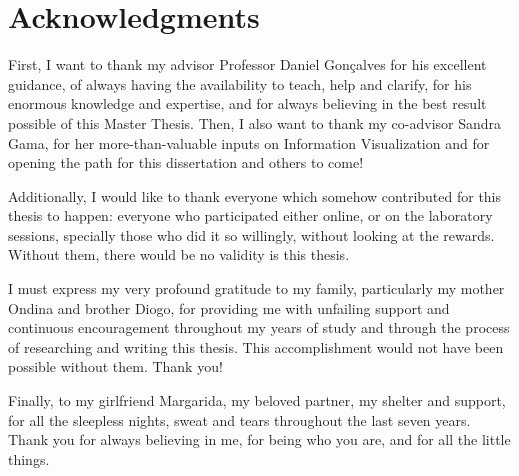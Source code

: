 
\chapter*{Acknowledgments}
%
First, I want to thank my advisor Professor Daniel Gonçalves for his excellent guidance, of always having the availability to teach, help and
clarify, for his enormous knowledge and expertise, and for always believing in the best result possible of this Master Thesis. Then, I also
want to thank my co-advisor Sandra Gama, for her more-than-valuable inputs on Information Visualization and for opening the path for this
dissertation and others to come! \\ \par
%
Additionally, I would like to thank everyone which somehow contributed for this thesis to happen: everyone who participated either online,
or on the laboratory sessions, specially those who did it so willingly, without looking at the rewards. Without them, there would be no
validity is this thesis.  \\ \par
%
I must express my very profound gratitude to my family, particularly my mother Ondina and brother Diogo, for providing me with unfailing support
and continuous encouragement throughout my years of study and through the process of researching and writing this thesis. This accomplishment
would not have been possible without them. Thank you! \\ \par
%
Finally, to my girlfriend Margarida, my beloved partner, my shelter and support, for all the sleepless nights, sweat and tears throughout
the last seven years. Thank you for always believing in me, for being who you are, and for all the little things. \\
